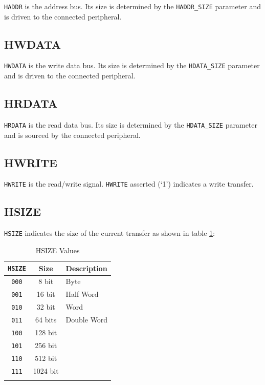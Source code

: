 \texttt{HADDR} is the address bus. Its size is determined by the
\texttt{HADDR\_SIZE} parameter and is driven to the connected
peripheral.

\subsection{HWDATA}

\texttt{HWDATA} is the write data bus. Its size is determined by the
\texttt{HDATA\_SIZE} parameter and is driven to the connected
peripheral.

\subsection{HRDATA}

\texttt{HRDATA} is the read data bus. Its size is determined by the
\texttt{HDATA\_SIZE} parameter and is sourced by the connected
peripheral.

\subsection{HWRITE}

\texttt{HWRITE} is the read/write signal. \texttt{HWRITE} asserted (`1')
indicates a write transfer.

\subsection{HSIZE}

\texttt{HSIZE} indicates the size of the current transfer as shown in table \ref{tab:HSIZE}:

\begin{longtable}[c]{@{\extracolsep{\fill}}ccl}	
	\toprule 
	\textbf{\texttt{HSIZE}} & \textbf{Size} & \textbf{Description}\\
	\midrule
	\endhead 
	\texttt{000} & 8 bit    & Byte\\
	\texttt{001} & 16 bit   & Half Word\\
	\texttt{010} & 32 bit   & Word\\
	\texttt{011} & 64 bits  & Double Word\\
	\texttt{100} & 128 bit  &\\
	\texttt{101} & 256 bit  &\\
	\texttt{110} & 512 bit  &\\
	\texttt{111} & 1024 bit &\\
	\bottomrule 	
	\caption{HSIZE Values}
	\label{tab:HSIZE}
\end{longtable}

